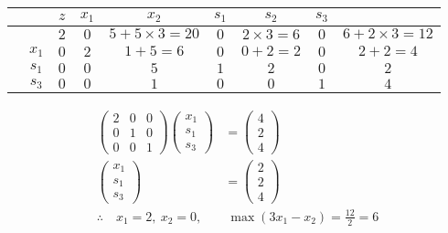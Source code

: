 \documentclass[a4paper,12pt]{article}
\begin{document}
\begin{table}[H]
    \footnotesize
    \begin{tabular}{cc|cccccc|c}
         &       & $z$ & $x_1$ & $x_2$                 & $s_1$ & $s_2$            & $s_3$ &                       \\
        \hline
         &       & $2$ & $0$   & $5 + 5 \times 3 = 20$ & $0$   & $2 \times 3 = 6$ & $0$   & $6 + 2 \times 3 = 12$ \\
        \hline
         & $x_1$ & $0$ & $2$   & $1 + 5 = 6$           & $0$   & $0 + 2 = 2$      & $0$   & $2 + 2 = 4$           \\
         & $s_1$ & $0$ & $0$   & $5$                   & $1$   & $2$              & $0$   & $2$                   \\
         & $s_3$ & $0$ & $0$   & $1$                   & $0$   & $0$              & $1$   & $4$                   \\
    \end{tabular}
\end{table}

\begin{align*}
    \begin{pmatrix}2 & 0 & 0 \\ 0 & 1 & 0 \\ 0 & 0 & 1\end{pmatrix} \begin{pmatrix}x_1 \\ s_1 \\ s_3\end{pmatrix} & = \begin{pmatrix}4 \\ 2 \\ 4\end{pmatrix} \\
    \begin{pmatrix}x_1 \\s_1 \\ s_3\end{pmatrix}                                                                  & = \begin{pmatrix}2 \\ 2 \\ 4\end{pmatrix} \\
    \therefore \quad x_1 = 2, \ x_2 = 0,                                                                          & \ \max{(3 x_1 - x_2)} = \frac{12}{2} = 6  \\
\end{align*}
\end{document}
